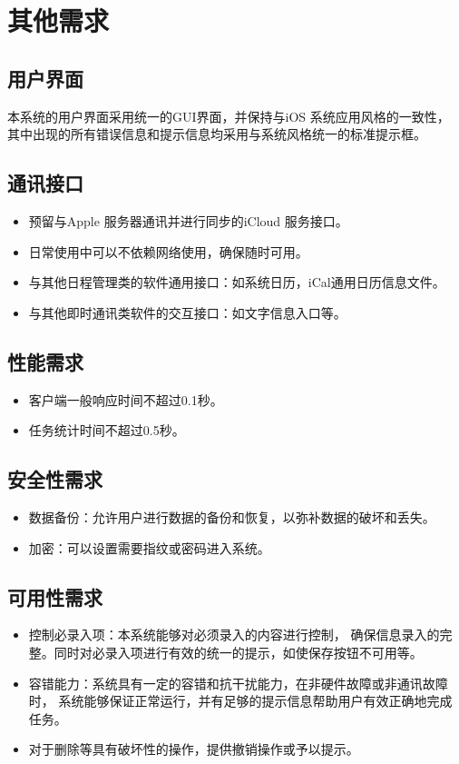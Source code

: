 \section{其他需求}
\subsection{用户界面}
本系统的用户界面采用统一的GUI界面，并保持与iOS 系统应用风格的一致性，
其中出现的所有错误信息和提示信息均采用与系统风格统一的标准提示框。

\subsection{通讯接口}
\begin{itemize}
	\item 预留与Apple 服务器通讯并进行同步的iCloud 服务接口。
	\item 日常使用中可以不依赖网络使用，确保随时可用。
	\item 与其他日程管理类的软件通用接口：如系统日历，iCal通用日历信息文件。
	\item 与其他即时通讯类软件的交互接口：如文字信息入口等。
\end{itemize}

\subsection{性能需求}
\begin{itemize}
	\item 客户端一般响应时间不超过0.1秒。
	\item 任务统计时间不超过0.5秒。
\end{itemize}

\subsection{安全性需求}
\begin{itemize}
	\item 数据备份：允许用户进行数据的备份和恢复，以弥补数据的破坏和丢失。
	\item 加密：可以设置需要指纹或密码进入系统。
\end{itemize}

\subsection{可用性需求}
\begin{itemize}
	\item 控制必录入项：本系统能够对必须录入的内容进行控制，
	确保信息录入的完整。同时对必录入项进行有效的统一的提示，如使保存按钮不可用等。
	\item 容错能力：系统具有一定的容错和抗干扰能力，在非硬件故障或非通讯故障时，
	系统能够保证正常运行，并有足够的提示信息帮助用户有效正确地完成任务。
	\item 对于删除等具有破坏性的操作，提供撤销操作或予以提示。
\end{itemize}